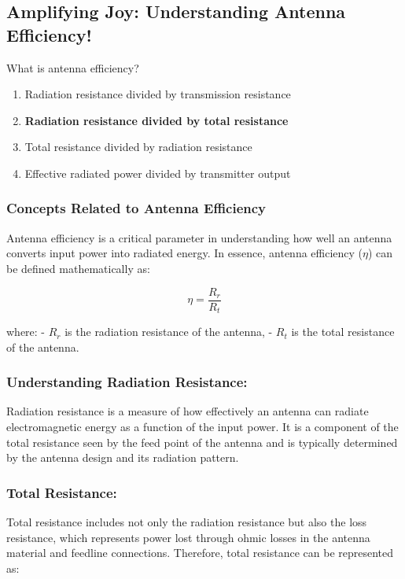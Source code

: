 \subsection{Amplifying Joy: Understanding Antenna Efficiency!}

\begin{tcolorbox}[colback=gray!10, colframe=black, title=E9A09] What is antenna efficiency?
\begin{enumerate}[label=\Alph*.]
    \item Radiation resistance divided by transmission resistance
    \item \textbf{Radiation resistance divided by total resistance}
    \item Total resistance divided by radiation resistance
    \item Effective radiated power divided by transmitter output
\end{enumerate} \end{tcolorbox}

\subsubsection{Concepts Related to Antenna Efficiency}

Antenna efficiency is a critical parameter in understanding how well an antenna converts input power into radiated energy. In essence, antenna efficiency (\(\eta\)) can be defined mathematically as:

\[
\eta = \frac{R_r}{R_t}
\]

where:
- \(R_r\) is the radiation resistance of the antenna,
- \(R_t\) is the total resistance of the antenna.

\subsubsection*{Understanding Radiation Resistance:}

Radiation resistance is a measure of how effectively an antenna can radiate electromagnetic energy as a function of the input power. It is a component of the total resistance seen by the feed point of the antenna and is typically determined by the antenna design and its radiation pattern.

\subsubsection*{Total Resistance:}

Total resistance includes not only the radiation resistance but also the loss resistance, which represents power lost through ohmic losses in the antenna material and feedline connections. Therefore, total resistance can be represented as:

